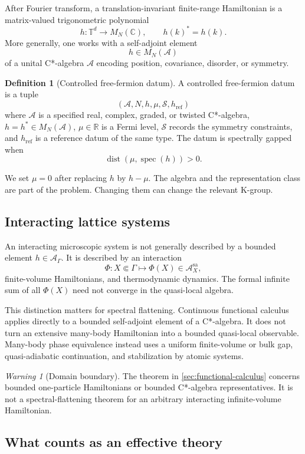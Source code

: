 \documentclass[12pt]{article}
\theoremstyle{definition}
\newtheorem{definition}[theorem]{Definition}
\theoremstyle{remark}
\newtheorem{warning}[theorem]{Warning}
\newcommand{\A}{\mathcal A}
\newcommand{\spec}{\operatorname{spec}}
\newcommand{\dist}{\operatorname{dist}}
\newcommand{\R}{\mathbb R}
\newcommand{\C}{\mathbb C}
\newcommand{\T}{\mathbb T}
\begin{document}
After Fourier transform, a translation-invariant finite-range Hamiltonian is
a matrix-valued trigonometric polynomial
\[
h:\T^d\longrightarrow M_N(\C),
\qquad
h(k)^*=h(k).
\]
More generally, one works with a self-adjoint element
\[
h\in M_N(\A)
\]
of a unital C*-algebra $\A$ encoding position, covariance, disorder, or
symmetry.

\begin{definition}[Controlled free-fermion datum]
A controlled free-fermion datum is a tuple
\[
(\A,N,h,\mu,\mathcal S,h_{\mathrm{ref}})
\]
where $\A$ is a specified real, complex, graded, or twisted C*-algebra,
$h=h^*\in M_N(\A)$, $\mu\in\R$ is a Fermi level,
$\mathcal S$ records the symmetry constraints, and
$h_{\mathrm{ref}}$ is a reference datum of the same type.
The datum is spectrally gapped when
\[
\dist(\mu,\spec(h))>0.
\]
\end{definition}

We set $\mu=0$ after replacing $h$ by $h-\mu$.
The algebra and the representation class are part of the problem.
Changing them can change the relevant K-group.

\subsection{Interacting lattice systems}

An interacting microscopic system is not generally described by a bounded
element $h\in\A_\Gamma$.
It is described by an interaction
\[
\Phi:X\Subset\Gamma\longmapsto\Phi(X)\in\A_X^{\mathrm{sa}},
\]
finite-volume Hamiltonians, and thermodynamic dynamics.
The formal infinite sum of all $\Phi(X)$ need not converge in the quasi-local
algebra.

This distinction matters for spectral flattening.
Continuous functional calculus applies directly to a bounded self-adjoint
element of a C*-algebra.
It does not turn an extensive many-body Hamiltonian into a bounded
quasi-local observable.
Many-body phase equivalence instead uses a uniform finite-volume or bulk gap,
quasi-adiabatic continuation, and stabilization by atomic systems.

\begin{warning}[Domain boundary]
The theorem in \cref{sec:functional-calculus} concerns bounded one-particle
Hamiltonians or bounded C*-algebra representatives.
It is not a spectral-flattening theorem for an arbitrary interacting
infinite-volume Hamiltonian.
\end{warning}

\subsection{What counts as an effective theory}
\end{document}
